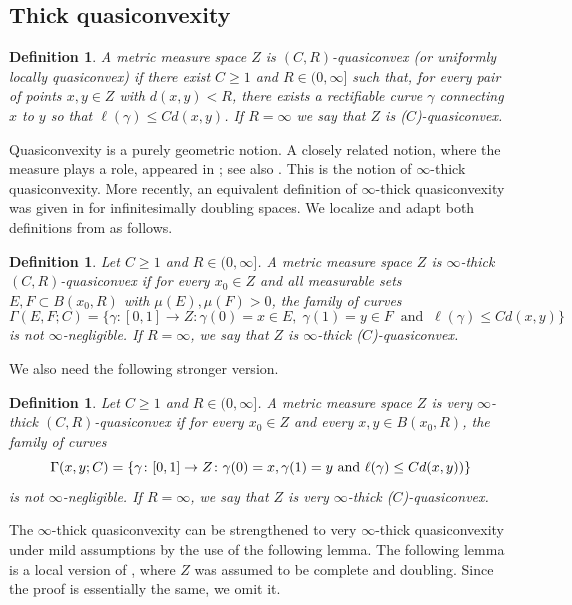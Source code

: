\documentclass[reqno]{amsart}
\numberwithin{equation}{section}
\newtheorem{definition}[theorem]{Definition}
\theoremstyle{remark}
\begin{document}
\subsection{Thick quasiconvexity}


\begin{definition}\label{def:quasi_R}
A  metric measure space $Z$ is $(C,R)$-quasiconvex (or uniformly locally quasiconvex) if there exist $C\geq 1$ and $R\in (0,\infty]$ such that, for every pair of points $x,y\in Z$ with $d( x, y )<R$, there exists a rectifiable curve $\gamma$ connecting $x$ to $y$ so that $\ell(\gamma)\leq Cd(x,y) $. If $R=\infty$ we say that $Z$ is ($C$)-quasiconvex. 

\end{definition}

Quasiconvexity is a purely geometric notion. A closely related notion, where the measure plays a role, appeared in \cite[Definition 4.1]{Durand_2}; see also \cite{DeCe:Pal:88}. This is the notion of $\infty$-thick quasiconvexity. More recently, an equivalent definition of $\infty$-thick quasiconvexity was given in \cite{Creutz_Soultanis} for infinitesimally doubling spaces. We localize and adapt both definitions from \cite{Durand_2,Creutz_Soultanis} as follows.

\begin{definition}\label{def:quasi_Z}
Let $C \geq 1$ and $R \in (0,\infty]$. A metric measure space $Z$ is \emph{$\infty$-thick $(C,R)$-quasiconvex} if for every $x_0\in Z$ and all measurable sets $E, F \subset  B( x_0, R )$ with $\mu(E), \mu(F) > 0$, the family of curves 
$$\Gamma( E, F; C )=\{\gamma \colon \left[0,1\right] \rightarrow Z \colon \gamma(0) = x \in E,\; \gamma(1) = y \in F\;\;\text{and}\;\;\ell( \gamma ) \leq C d( x, y )\}$$ is not $\infty$-negligible. If $R=\infty$, we say that $Z$ is $\infty$-thick ($C$)-quasiconvex.
\end{definition}
We also need the following stronger version.
\begin{definition}\label{def:verythick}
Let $C\geq 1$ and $R\in(0, \infty]$. A metric measure space $Z$ is very $\infty$-thick $(C, R)$-quasiconvex if for every $x_0\in Z$ and every $x, y\in B(x_0, R)$, the family of curves 
\[\Gamma(x, y; C)=\left\{\gamma\colon[0, 1]\to Z\colon\gamma(0)=x, \gamma(1)=y\ {\rm and}\ \ell(\gamma)\leq Cd(x, y))\right\}\]
is not $\infty$-negligible. If $R=\infty$, we say that $Z$ is very $\infty$-thick ($C$)-quasiconvex.
\end{definition}
The $\infty$-thick quasiconvexity can be strengthened to very $\infty$-thick quasiconvexity under mild assumptions by the use of the following lemma. The following lemma is a local version of \cite[Theorem 3.1]{D-CJS2016}, where $Z$ was assumed to be  complete and doubling. Since the proof is essentially the same, we omit it.
\end{document}
